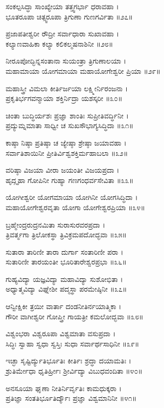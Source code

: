 ಸಂಕಲ್ಪಸಿದ್ಧಾ ಸಾಂಖ್ಯೇಯಾ ತತ್ತ್ವಗರ್ಭಾ ಧರಾವಹಾ ।\\
ಭೂತರೂಪಾ ಚಿತ್ಸ್ವರೂಪಾ ತ್ರಿಗುಣಾ ಗುಣಗರ್ವಿತಾ ॥೨೭॥

ಪ್ರಜಾಪತೀಶ್ವರೀ ರೌದ್ರೀ ಸರ್ವಾಧಾರಾ ಸುಖಾವಹಾ ।\\
ಕಲ್ಯಾಣವಾಹಿಕಾ ಕಲ್ಯಾ ಕಲಿಕಲ್ಮಷನಾಶಿನೀ ॥೨೮॥

ನೀರೂಪೋದ್ಭಿನ್ನಸಂತಾನಾ ಸುಯಂತ್ರಾ ತ್ರಿಗುಣಾಲಯಾ ।\\
ಮಹಾಮಾಯಾ ಯೋಗಮಾಯಾ ಮಹಾಯೋಗೇಶ್ವರೀ ಪ್ರಿಯಾ ॥೨೯॥

ಮಹಾಸ್ತ್ರೀ ವಿಮಲಾ ಕೀರ್ತಿರ್ಜಯಾ ಲಕ್ಷ್ಮೀರ್ನಿರಂಜನಾ ।\\
ಪ್ರಕೃತಿರ್ಭಗವನ್ಮಾಯಾ ಶಕ್ತಿರ್ನಿದ್ರಾ ಯಶಸ್ಕರೀ ॥೩೦॥

ಚಿಂತಾ ಬುದ್ಧಿರ್ಯಶಃ ಪ್ರಜ್ಞಾ ಶಾಂತಿಃ ಸುಪ್ರೀತಿವರ್ದ್ಧಿನೀ ।\\
ಪ್ರದ್ಯುಮ್ನಮಾತಾ ಸಾಧ್ವೀ ಚ ಸುಖಸೌಭಾಗ್ಯಸಿದ್ಧಿದಾ ॥೩೧॥

ಕಾಷ್ಠಾ ನಿಷ್ಠಾ ಪ್ರತಿಷ್ಠಾ ಚ ಜ್ಯೇಷ್ಠಾ ಶ್ರೇಷ್ಠಾ ಜಯಾವಹಾ ।\\
ಸರ್ವಾತಿಶಾಯಿನೀ ಪ್ರೀತಿರ್ವಿಶ್ವಶಕ್ತಿರ್ಮಹಾಬಲಾ ॥೩೨॥

ವರಿಷ್ಠಾ ವಿಜಯಾ ವೀರಾ ಜಯಂತೀ ವಿಜಯಪ್ರದಾ ।\\
ಹೃದ್ಗೃಹಾ ಗೋಪಿನೀ ಗುಹ್ಯಾ ಗಣಗಂಧರ್ವಸೇವಿತಾ ॥೩೩॥

ಯೋಗೀಶ್ವರೀ ಯೋಗಮಾಯಾ ಯೋಗಿನೀ ಯೋಗಸಿದ್ಧಿದಾ ।\\
ಮಹಾಯೋಗೇಶ್ವರವೃತಾ ಯೋಗಾ ಯೋಗೇಶ್ವರಪ್ರಿಯಾ ॥೩೪॥

ಬ್ರಹ್ಮೇಂದ್ರರುದ್ರನಮಿತಾ ಸುರಾಸುರವರಪ್ರದಾ ।\\
ತ್ರಿವರ್ತ್ಮಗಾ ತ್ರಿಲೋಕಸ್ಥಾ ತ್ರಿವಿಕ್ರಮಪದೋದ್ಭವಾ ॥೩೫॥

ಸುತಾರಾ ತಾರಿಣೀ ತಾರಾ ದುರ್ಗಾ ಸಂತಾರಿಣೀ ಪರಾ ।\\
ಸುತಾರಿಣೀ ತಾರಯಂತೀ ಭೂರಿತಾರೇಶ್ವರಪ್ರಭಾ ॥೩೬॥

ಗುಹ್ಯವಿದ್ಯಾ ಯಜ್ಞವಿದ್ಯಾ ಮಹಾವಿದ್ಯಾ ಸುಶೋಭಿತಾ ।\\
ಅಧ್ಯಾತ್ಮವಿದ್ಯಾ ವಿಘ್ನೇಶೀ ಪದ್ಮಸ್ಥಾ ಪರಮೇಷ್ಠಿನೀ ॥೩೭॥

ಆನ್ವೀಕ್ಷಿಕೀ ತ್ರಯೀ ವಾರ್ತಾ ದಂಡನೀತಿರ್ನಯಾತ್ಮಿಕಾ ।\\
ಗೌರೀ ವಾಗೀಶ್ವರೀ ಗೋಪ್ತ್ರೀ ಗಾಯತ್ರೀ ಕಮಲೋದ್ಭವಾ ॥೩೮॥

ವಿಶ್ವಂಭರಾ ವಿಶ್ವರೂಪಾ ವಿಶ್ವಮಾತಾ ವಸುಪ್ರದಾ ।\\
ಸಿದ್ಧಿಃ ಸ್ವಾಹಾ ಸ್ವಧಾ ಸ್ವಸ್ತಿಃ ಸುಧಾ ಸರ್ವಾರ್ಥಸಾಧಿನೀ ॥೩೯॥

ಇಚ್ಛಾ ಸೃಷ್ಟಿರ್ದ್ಯುತಿರ್ಭೂತಿಃ ಕೀರ್ತಿಃ ಶ್ರದ್ಧಾ ದಯಾಮತಿಃ ।\\
ಶ್ರುತಿರ್ಮೇಧಾ ಧೃತಿರ್ಹ್ರೀಃ ಶ್ರೀರ್ವಿದ್ಯಾ ವಿಬುಧವಂದಿತಾ ॥೪೦॥

ಅನಸೂಯಾ ಘೃಣಾ ನೀತಿರ್ನಿರ್ವೃತಿಃ ಕಾಮಧುಕ್ಕರಾ ।\\
ಪ್ರತಿಜ್ಞಾ ಸಂತತಿರ್ಭೂತಿರ್ದ್ಯೌಃ ಪ್ರಜ್ಞಾ ವಿಶ್ವಮಾನಿನೀ ॥೪೧॥

